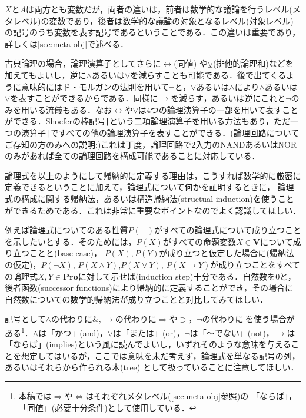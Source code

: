 \documentclass{ltjsarticle}
\theoremstyle{mystyle1}
\theoremstyle{mystyle3}
\theoremstyle{mystyle2}
\newcommand{\uA}{\underline{A}}
\newcommand{\bV}{\ensuremath{\mathbf{V}}}
\newcommand{\bPro}{\ensuremath{\mathbf{Pro}}}
\newcommand{\red}[1]{{\color{red} #1}}
\begin{document}
$X$と$\uA$は両方とも変数だが，両者の違いは，前者は数学的な議論を行うレベル(メタレベル)の変数であり，後者は数学的な議論の対象となるレベル(対象レベル)の記号のうち変数を表す記号であるということである．この違いは重要であり，詳しくは\ref{sec:meta-obj}で述べる．

古典論理の場合，論理演算子としてさらに$\leftrightarrow$(同値) や$\veebar$(排他的論理和)などを加えてもよいし，逆に$\wedge$あるいは$\vee$を減らすことも可能である．後で出てくるように意味的にはド・モルガンの法則を用いて$\neg$と，$\vee$あるいは$\wedge$により$\wedge$あるいは$\vee$を表すことができるからである．同様に$\to$を減らす，あるいは逆にこれと$\neg$のみを用いる流儀もある．なお$\leftrightarrow$や$\veebar$は4つの論理演算子の一部を用いて表すことができる．Shoeferの棒記号\verb!|!という二項論理演算子を用いる方法もあり，ただ一つの演算子\verb!|!ですべての他の論理演算子を表すことができる．(論理回路についてご存知の方のみへの説明:)これは丁度，論理回路で2入力のNANDあるいはNORのみがあれば全ての論理回路を構成可能であることに対応している．

論理式を以上のようにして帰納的に定義する理由は，こうすれば数学的に厳密に定義できるということに加えて，論理式について何かを証明するときに，\red{論理式の構成に関する帰納法，あるいは構造帰納法}(structual induction)を使うことができるためである．これは非常に重要なポイントなのでよく認識してほしい．

例えば論理式についてのある性質$P\left(-\right)$がすべての論理式について成り立つことを示したいとする．そのためには，$P\left(X\right)$がすべての命題変数$X\in\bV$について成り立つことと(base case)， $P(X),P(Y)$が成り立つと仮定した場合に(帰納法の仮定)，$P(\neg X)$, $P(X\wedge Y)$,$P(X\vee Y)$, $P(X \to Y)$が成り立つことをすべての論理式$X,Y\in \bPro$に対して示せば(induction step)十分である．自然数を0と，\red{後者函数}(successor functions)により帰納的に定義することができ，その場合に自然数についての数学的帰納法が成り立つことと対比してみてほしい．

記号として$\wedge$の代わりに$\&,\to$の代わりに$\Rightarrow$や$\supset$，$\neg$の代わりに$~$を使う場合がある\footnote{本稿では$\Rightarrow$や$\Leftrightarrow$はそれぞれメタレベル(\ref{sec:meta-obj}参照)の 「ならば」，「同値」(必要十分条件)として使用している．}．$\wedge$は「かつ」(and)，$\vee$は「または」(or)，$\neg$は「～でない」(not)，$\to$は「ならば」(implies)という風に読んでよいし，いずれそのような意味を与えることを想定してはいるが，ここでは意味を未だ考えず，論理式を単なる記号の列，あるいはそれらから作られる木(tree) として扱っていることに注意してほしい．
\end{document}
